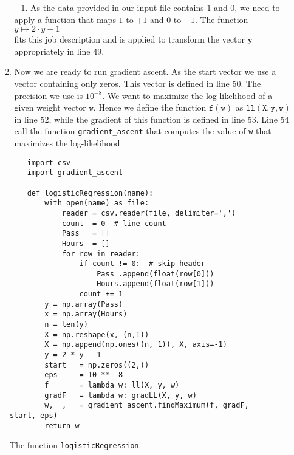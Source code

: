 \begin{enumerate}
\begin{enumerate}
            $-1$.  As the data provided in our input file contains $1$ and $0$, we need to apply a function that maps $1$ to $+1$ and $0$ to $-1$.
            The function
            \\[0.2cm]
            \hspace*{1.3cm}
            $y \mapsto 2 \cdot y - 1$
            \\[0.2cm]
            fits this job description and is applied to transform the vector $\mathbf{y}$ appropriately in line
            49.
      \item Now we are ready to run gradient ascent.  As the start vector we use a vector containing only
            zeros.  This vector is defined in line 50.  The precision we use is $10^{-8}$.
            We want to maximize the log-likelihood of a given weight vector $\mathtt{w}$.  Hence we define the
            function $\texttt{f}(\texttt{w})$ as $\mathtt{ll}(\mathtt{X}, \mathtt{y}, \mathtt{w})$ in line 52,
            while the gradient of this function is defined in line 53.
            Line 54 call the function \texttt{gradient\_ascent} that computes the value of \texttt{w} that
            maximizes the log-likelihood.            
      \end{enumerate}
\end{enumerate}

\begin{figure}[!ht]
\centering

\begin{verbatim}              
    import csv
    import gradient_ascent

    def logisticRegression(name):
        with open(name) as file:
            reader = csv.reader(file, delimiter=',')
            count  = 0  # line count
            Pass   = []
            Hours  = []
            for row in reader:
                if count != 0:  # skip header
                    Pass .append(float(row[0]))
                    Hours.append(float(row[1]))
                count += 1
        y = np.array(Pass)
        x = np.array(Hours)
        n = len(y)
        X = np.reshape(x, (n,1))
        X = np.append(np.ones((n, 1)), X, axis=-1)
        y = 2 * y - 1
        start   = np.zeros((2,))
        eps     = 10 ** -8
        f       = lambda w: ll(X, y, w)
        gradF   = lambda w: gradLL(X, y, w)
        w, _, _ = gradient_ascent.findMaximum(f, gradF, start, eps)
        return w
\end{verbatim}

\caption{The function \texttt{logisticRegression}.}
\label{fig:logistic_regression.py:2}
\end{figure}
\FloatBarrier

